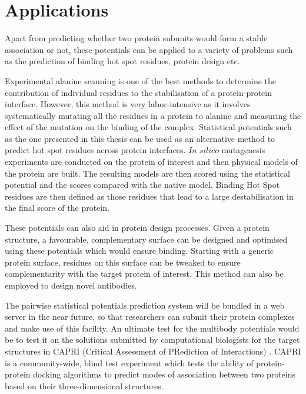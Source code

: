 \section{Applications}
\par
Apart from predicting whether two protein subunits would form a stable association or not, these potentials can be applied to a variety of problems such as the prediction of binding hot spot residues, protein design etc.
\par
Experimental alanine scanning is one of the best methods to determine the contribution of individual residues to the stabilisation of a protein-protein interface. However, this method is very labor-intensive as it involves systematically mutating all the residues in a protein to alanine and measuring the effect of the mutation on the binding of the complex. Statistical potentials such as the one presented in this thesis can be used as an alternative method to predict hot spot residues across protein interfaces. $In \; silico$ mutagenesis experiments are conducted on the protein of interest and then physical models of the protein are built. The resulting models are then scored using the statistical potential and the scores compared with the native model. Binding Hot Spot residues are then defined as those residues that lead to a large destabilisation in the final score of the protein.
\par
These potentials can also aid in protein design processes. Given a protein structure, a favourable, complementary surface can be designed and optimised using these potentials which would ensure binding. Starting with a generic protein surface, residues on this surface can be tweaked to ensure complementarity with the target protein of interest. This method can also be employed to design novel antibodies.
\par
The pairwise statistical potentials prediction system will be bundled in a web server in the near future, so that researchers can submit their protein complexes and make use of this facility. An ultimate test for the multibody potentials would be to test it on the solutions submitted by computational biologists for the target structures in CAPRI (Critical Assessment of PRediction of Interactions) \citep{Janin2002}. CAPRI is a community-wide, blind test experiment which tests the ability of protein-protein docking algorithms to predict modes of association between two proteins based on their three-dimensional structures.


